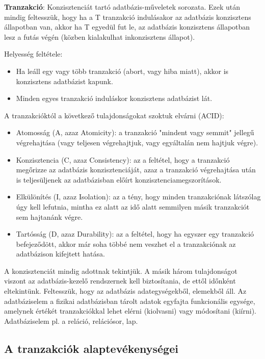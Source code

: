 \documentclass[margin=0px]{article}
\begin{document}
\noindent \textbf{Tranzakció}: Konzisztenciát tartó adatbázis-műveletek sorozata. Ezek után mindig feltesszük, hogy ha
a T tranzakció indulásakor az adatbázis konzisztens állapotban van, akkor ha T egyedül fut le, az adatbázis konzisztens állapotban
lesz a futás végén (közben kialakulhat inkonzisztens állapot).

\noindent Helyesség feltétele:
\begin{itemize}
    \item	Ha leáll egy vagy több tranzakció (abort, vagy hiba miatt), akkor is konzisztens adatbázist kapunk.
    \item	Minden egyes tranzakció induláskor konzisztens adatbázist lát.
\end{itemize}

\noindent A tranzakcióktól a következő tulajdonságokat szoktuk elvárni (ACID):

\begin{itemize}
    \item	Atomosság (A, azaz Atomicity): a tranzakció "mindent vagy semmit" jellegű végrehajtása (vagy teljesen végrehajtjuk, vagy egyáltalán nem hajtjuk végre).

    \item	Konzisztencia (C, azaz Consistency): az a feltétel, hogy a tranzakció megőrizze az adatbázis konzisztenciáját, azaz a tranzakció végrehajtása után is teljesüljenek az adatbázisban előírt konzisztenciamegszorítások.

    \item	Elkülönítés (I, azaz Isolation): az a tény, hogy minden tranzakciónak látszólag úgy kell lefutnia, mintha ez alatt az idő alatt semmilyen másik tranzakciót sem hajtanánk végre.

    \item	Tartósság (D, azaz Durability): az a feltétel, hogy ha egyszer egy tranzakció befejeződött, akkor már soha többé nem veszhet el a tranzakciónak az adatbázison kifejtett hatása.
\end{itemize}
A konzisztenciát mindig adottnak tekintjük. A másik három tulajdonságot viszont az adatbázis-kezelő rendszernek kell biztosítania, de ettől időnként eltekintünk. Feltesszük, hogy az adatbázis adategységekből, elemekből áll. Az adatbáziselem a fizikai adatbázisban tárolt adatok egyfajta funkcionális egysége, amelynek értékét tranzakciókkal lehet elérni (kiolvasni) vagy módosítani (kiírni). Adatbáziselem
pl. a reláció, relációsor, lap.\\

\subsection{A tranzakciók alaptevékenységei}
\end{document}
